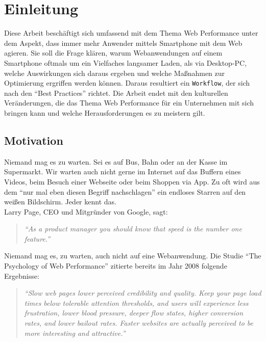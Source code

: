 \setcounter{page}{1}

\section{Einleitung} %
\label{sec:einleitung}
	Diese Arbeit beschäftigt sich umfassend mit dem Thema Web Performance unter dem Aspekt, dass immer mehr Anwender mittels Smartphone mit dem Web agieren. Sie soll die Frage klären, warum Webanwendungen auf einem Smartphone oftmals um ein Vielfaches langsamer Laden, als via Desktop-PC, welche Auswirkungen sich daraus ergeben und welche Maßnahmen zur Optimierung ergriffen werden können. Daraus resultiert ein \texttt{Workflow}, der sich nach den "`Best Practices"' richtet. Die Arbeit endet mit den kulturellen Veränderungen, die das Thema Web Performance für ein Unternehmen mit sich bringen kann und welche Herausforderungen es zu meistern gilt.

	\subsection{Motivation} %
	\label{sub:motivation}

		Niemand mag es zu warten. Sei es auf Bus, Bahn oder an der Kasse im Supermarkt. Wir warten auch nicht gerne im Internet auf das Buffern eines Videos, beim Besuch einer Webseite oder beim Shoppen via App. Zu oft wird aus dem "`nur mal eben diesen Begriff nachschlagen"' ein endloses Starren auf den weißen Bildschirm. Jeder kennt das.\\

		Larry Page, CEO und Mitgründer von Google, sagt:
		\begin{quote}
			\textit{"`As a product manager you should know that speed is the number one feature."'}\autocite{holzle10}
		\end{quote}
		Niemand mag es, zu warten, auch nicht auf eine Webanwendung. Die Studie "`The Psychology of Web Performance"' zitierte bereits im Jahr 2008 folgende Ergebnisse:

		\begin{quote}\itshape
			"`Slow web pages lower perceived credibility and quality. Keep your page load times below tolerable attention thresholds, and users will experience less frustration, lower blood pressure, deeper flow states, higher conversion rates, and lower bailout rates. Faster websites are actually perceived to be more interesting and attractive."' \autocite{webOpti08}
		\end{quote}

